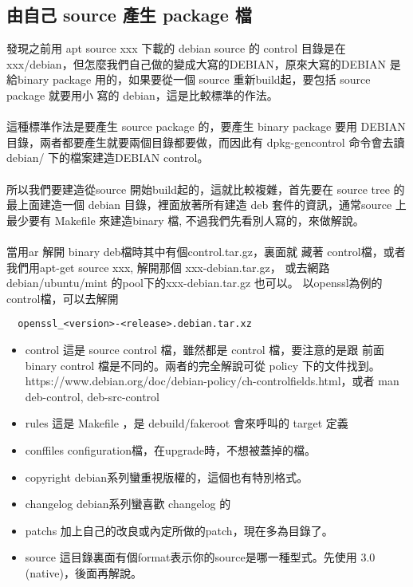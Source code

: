   \subsection{由自己 source 產生 package 檔}
  發現之前用 apt source xxx 下載的 debian source 的 control 目錄是在
  xxx/debian，但怎麼我們自己做的變成大寫的DEBIAN，原來大寫的DEBIAN 是給binary
  package 用的，如果要從一個 source 重新build起，要包括 source package 就要用小
  寫的 debian，這是比較標準的作法。
  \\\\
  這種標準作法是要產生 source package 的，要產生 binary package 要用 DEBIAN
  目錄，兩者都要產生就要兩個目錄都要做，而因此有 dpkg-gencontrol 命令會去讀
  debian/ 下的檔案建造DEBIAN control。
  \\\\
  所以我們要建造從source 開始build起的，這就比較複雜，首先要在 source tree 的
  最上面建造一個 debian 目錄，裡面放著所有建造 deb 套件的資訊，通常source 上
  最少要有 Makefile 來建造binary 檔, 不過我們先看別人寫的，來做解說。
  \\\\
  當用ar 解開 binary deb檔時其中有個control.tar.gz，裏面就
  藏著 control檔，或者我們用apt-get source xxx, 解開那個 xxx-debian.tar.gz，
  或去網路 debian/ubuntu/mint 的pool下的xxx-debian.tar.gz 也可以。
  以openssl為例的control檔，可以去解開
  \begin{verbatim}
  openssl_<version>-<release>.debian.tar.xz
  \end{verbatim}
  \begin{itemize}
    \item control 這是 source control 檔，雖然都是 control 檔，要注意的是跟
      前面 binary control 檔是不同的。兩者的完全解說可從 policy 下的文件找到。
      https://www.debian.org/doc/debian-policy/ch-controlfields.html，或者
      man deb-control, deb-src-control
    \item rules     這是 Makefile ，是 debuild/fakeroot 會來呼叫的 target 定義
    \item conffiles configuration檔，在upgrade時，不想被蓋掉的檔。
    \item copyright debian系列蠻重視版權的，這個也有特別格式。
    \item changelog debian系列蠻喜歡 changelog 的
    \item patchs 加上自己的改良或內定所做的patch，現在多為目錄了。
    \item source 這目錄裏面有個format表示你的source是哪一種型式。先使用
      3.0 (native)，後面再解說。
  \end{itemize}
